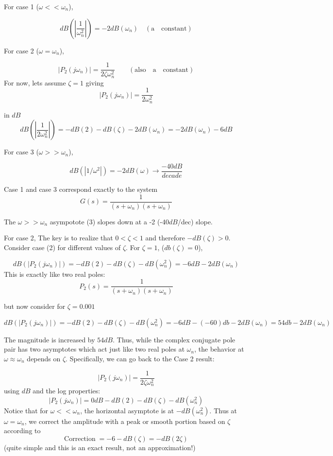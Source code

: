 For case 1 ($\omega << \omega_n$),

\[
dB(|\frac{1}{\omega_n^2}|) = -2dB(\omega_n) \quad \mathrm{(a\quad constant)}
\]

For case 2 ($\omega =  \omega_n$),

\[
|P_2(j\omega_n)| =  \frac {1}  {2\zeta \omega_n^2} \qquad \mathrm{(also\quad a\quad constant)}
\]
For now, lets assume $\zeta=1$ giving
\[
|P_2(j\omega_n)| =  \frac {1}  {2\omega_n^2}
\]

in $dB$
\[
dB(| \frac {1}  {2 \omega_n^2} |) =  -dB(2) -dB(\zeta) -2dB(\omega_n) = -2dB(\omega_n)-6dB
\]

For case 3 ($\omega >>  \omega_n$),

\[
dB(|1/\omega^2|) = -2dB(\omega) \to \frac {-40dB}  {decade}
\]

Case 1 and case 3 correspond exactly to the system
\[
G(s) = \frac {1}{(s+\omega_n)(s+\omega_n)}
\]


The $\omega >> \omega_n$ asympotote (3) slopes down at a -2 (-40$dB$/dec) slope.


For case 2, The key is to realize that $0<\zeta<1$ and therefore $-dB(\zeta) > 0$.
Consider case (2) for different values of $\zeta$.  For $\zeta = 1$, ($db(\zeta)=0$),

\[
dB(|P_2(j\omega_n)|) =  -dB(2) -dB(\zeta) -dB(\omega_n^2) = -6dB -2 dB(\omega_n)
\]
This is exactly like two real poles:
\[
P_2(s) = \frac {1}{(s+\omega_n)(s+\omega_n)}
\]

but now consider for $\zeta= 0.001$

\[
dB(|P_2(j\omega_n)|) =  -dB(2) -dB(\zeta) -dB(\omega_n^2) = -6dB -(-60)db -2 dB(\omega_n) = 54db-2dB(\omega_n)
\]

The magnitude is increased by $54dB$.   Thus, while the complex conjugate pole pair has two asymptotes which act just like two real poles at $\omega_n$, the behavior at $\omega \approx \omega_n$ depends on $\zeta$.
Specifically, we can go back to the Case 2 result:

\[
|P_2(j\omega_n)| =  \frac {1}  {2\zeta \omega_n^2}
\]
using $dB$ and the log properties:
\[
|P_2(j\omega_n)| = 0dB - dB(2) - dB(\zeta) - dB(\omega_n^2)
\]
Notice that for $\omega<<\omega_n$, the horizontal asymptote is at $- dB(\omega_n^2)$.  Thus at
$\omega=\omega_n$, we correct the amplitude with a peak or smooth portion based on $\zeta$ according
to
\[
\mathrm{Correction}\; = -6 -dB(\zeta) = -dB(2\zeta)
\]
(quite simple and this is an exact result, not an approximation!)

